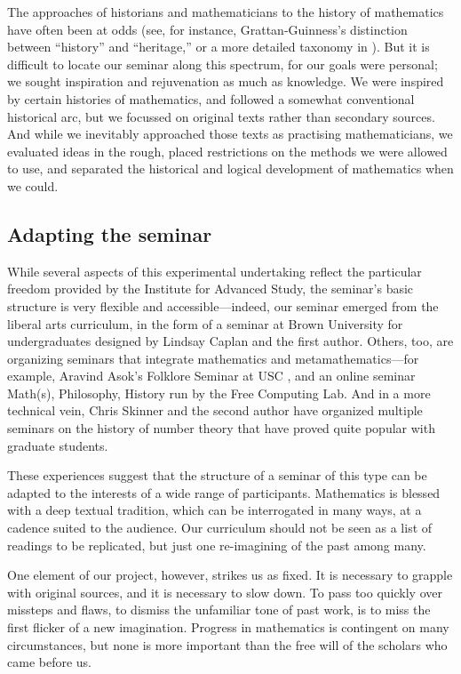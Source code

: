 \documentclass{article}
\begin{document}
The approaches of historians and mathematicians to the history of mathematics have often been at odds (see, for instance, Grattan-Guinness’s distinction \cite{GG} between “history” and “heritage,” or a more detailed taxonomy in \cite{Fried}). But it is difficult to locate our seminar along this spectrum, for our goals were personal; we sought inspiration and rejuvenation as much as knowledge. We were inspired by certain histories of mathematics, and followed a somewhat conventional historical arc, but we focussed on original texts rather than secondary sources. And while we inevitably approached those texts as practising mathematicians, we evaluated ideas in the rough, placed restrictions on the methods we were allowed to use, and separated the historical and logical development of mathematics when we could.

 



 
 

 
 

\subsection{Adapting the seminar}
 
 While several aspects of this experimental undertaking reflect the particular freedom provided by the Institute for Advanced Study, the seminar’s basic structure is very flexible and accessible---indeed, our seminar emerged from the liberal arts curriculum, in the form of a seminar at Brown University for undergraduates designed by Lindsay Caplan and the first author. Others, too, are organizing seminars that integrate mathematics and metamathematics—for example, Aravind Asok’s Folklore Seminar at USC \cite{asok_seminar}, and an online seminar Math(s), Philosophy, History run by the Free Computing Lab. And in a more technical vein, Chris Skinner and the second author have organized multiple seminars on the history of number theory that have proved quite popular with graduate students.
 
These experiences suggest that the structure of a seminar of this type can be adapted to the interests of a wide range of participants. Mathematics is blessed with a deep textual tradition, which can be interrogated in many ways, at a cadence suited to the audience. Our curriculum should not be seen as a list of readings to be replicated, but just one re-imagining of the past among many.

One element of our project, however, strikes us as fixed. It is necessary to grapple with original sources, and it is necessary to slow down. To pass too quickly over missteps and flaws, to dismiss the unfamiliar tone of past work, is to miss the first flicker of a new imagination. Progress in mathematics is contingent on many circumstances, but none is more important than the free will of the scholars who came before us.
\end{document}
